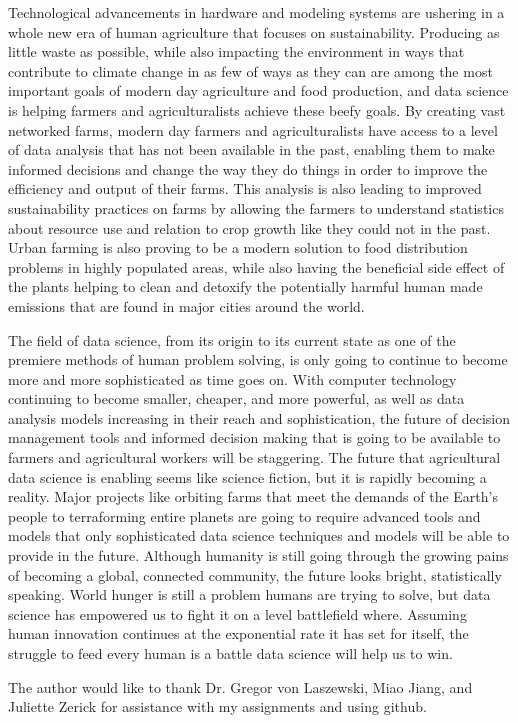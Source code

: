 \documentclass[sigconf]{acmart}
\begin{document}
Technological advancements in hardware and modeling systems are ushering in a whole new era of human agriculture that focuses on sustainability. Producing as little waste as possible, while also impacting the environment in ways that contribute to climate change in as few of ways as they can are among the most important goals of modern day agriculture and food production, and data science is helping farmers and agriculturalists achieve these beefy goals. By creating vast networked farms, modern day farmers and agriculturalists have access to a level of data analysis that has not been available in the past, enabling them to make informed decisions and change the way they do things in order to improve the efficiency and output of their farms. This analysis is also leading to improved sustainability practices on farms by allowing the farmers to understand statistics about resource use and relation to crop growth like they could not in the past. Urban farming is also proving to be a modern solution to food distribution problems in highly populated areas, while also having the beneficial side effect of the plants helping to clean and detoxify the potentially harmful human made emissions that are found in major cities around the world.

The field of data science, from its origin to its current state as one of the premiere methods of human problem solving, is only going to continue to become more and more sophisticated as time goes on. With computer technology continuing to become smaller, cheaper, and more powerful, as well as data analysis models increasing in their reach and sophistication, the future of decision management tools and informed decision making that is going to be available to farmers and agricultural workers will be staggering. The future that agricultural data science is enabling seems like science fiction, but it is rapidly becoming a reality. Major projects like orbiting farms that meet the demands of the Earth's people to terraforming entire planets are going to require advanced tools and models that only sophisticated data science techniques and models will be able to provide in the future. Although humanity is still going through the growing pains of becoming a global, connected community, the future looks bright, statistically speaking. World hunger is still a problem humans are trying to solve, but data science has empowered us to fight it on a level battlefield where. Assuming human innovation continues at the exponential rate it has set for itself, the struggle to feed every human is a battle data science will help us to win.

\begin{acks}

The author would like to thank Dr. Gregor von Laszewski, Miao Jiang, and Juliette Zerick for assistance with my assignments and using github.

\end{acks}



 
\end{document}
